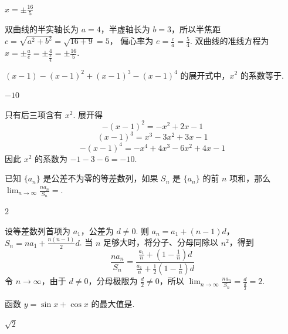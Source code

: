 \begin{answer}
\(x=\pm\frac{16}{5}\)
\end{answer}

\begin{solution}
双曲线的半实轴长为 \(a=4\)，半虚轴长为 \(b=3\)，所以半焦距
\(c=\sqrt{a^2+b^2}=\sqrt{16+9}=5\)，
偏心率为 \(e=\frac ca=\frac54\). 双曲线的准线方程为
\(x=\pm\frac ae=\pm\frac{4}{\frac{5}{4}}=\pm\frac{16}{5}\).
\end{solution}

\begin{problem}
\((x - 1) - (x - 1)^{2} + (x - 1)^{3} - (x - 1)^{4}\) 的展开式中，\(x^{2}\) 的系数等于\fillinblank{}.
\end{problem}

\begin{answer}
\(-10\)
\end{answer}

\begin{solution}
只有后三项含有 \(x^2\). 展开得
\[
-(x-1)^2=-x^2+2x-1
\]
\[
(x-1)^3=x^3-3x^2+3x-1
\]
\[
-(x-1)^4=-x^4+4x^3-6x^2+4x-1
\]
因此 \(x^2\) 的系数为
\(-1-3-6=-10\).
\end{solution}

\begin{problem}
已知 \(\{a_n\}\) 是公差不为零的等差数列，如果 \(S_n\) 是 \(\{a_n\}\) 的前 \(n\) 项和，那么 \(\displaystyle\lim_{n\to\infty}\frac{na_n}{S_n}=\)\fillinblank{}.
\end{problem}

\begin{answer}
\(2\)
\end{answer}

\begin{solution}
	设等差数列首项为 \(a_1\)，公差为 \(d\ne0\). 则
\(a_n=a_1+(n-1)d\)，\(S_n=na_1+\frac{n(n-1)}{2}d\).
当 \(n\) 足够大时，将分子、分母同除以 \(n^2\)，得到
\[
\frac{na_n}{S_n}
=\frac{\frac{a_1}{n}+\left(1-\frac1n\right)d}
{\frac{a_1}{n}+\frac{1}{2}\left(1-\frac1n\right)d}
\]
令 \(n\to\infty\)，由于 \(d\ne0\)，分母极限为 \(\frac{d}{2}\ne0\)，所以
\(\displaystyle\lim_{n\to\infty}\frac{na_n}{S_n}=\frac d{\frac{d}{2}}=2\).
\end{solution}

\begin{problem}
函数 \(y=\sin x+\cos x\) 的最大值是\fillinblank{}.
\end{problem}

\begin{answer}
\(\sqrt{2}\)
\end{answer}

